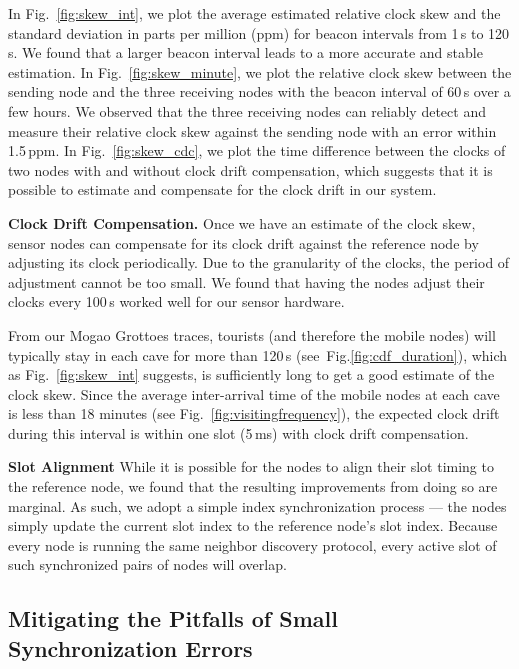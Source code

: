 \documentclass[twoside,twocolumn]{article}
\begin{document}
In Fig.~\ref{fig:skew_int}, we plot the average estimated relative
clock skew and the standard deviation in parts per million (ppm) for
beacon intervals from 1\,s to 120\,s. We found that a larger beacon
interval leads to a more accurate and stable estimation.  In
Fig.~\ref{fig:skew_minute}, we plot the relative clock skew between
the sending node and the three receiving nodes with the beacon
interval of 60\,s over a few hours.  We observed that the three
receiving nodes can reliably detect and measure their relative clock
skew against the sending node with an error within 1.5\,ppm. In
Fig.~\ref{fig:skew_cdc}, we plot the time difference between the
clocks of two nodes with and without clock drift compensation, which
suggests that it is possible to estimate and compensate for the clock
drift in our system.

{\bf Clock Drift Compensation.} Once we have an estimate of the clock
skew, sensor nodes can compensate for its clock drift against the
reference node by adjusting its clock periodically. Due to the
granularity of the clocks, the period of adjustment cannot be too
small. We found that having the nodes adjust their clocks every 100\,s
worked well for our sensor hardware.

From our Mogao Grottoes traces, tourists (and therefore the mobile
nodes) will typically stay in each cave for more than 120\,s
(see~Fig.\ref{fig:cdf_duration}), which as Fig.~\ref{fig:skew_int}
suggests, is sufficiently long to get a good estimate of the clock
skew. Since the average inter-arrival time of the mobile nodes at each
cave is less than 18 minutes (see Fig.~\ref{fig:visitingfrequency}),
the expected clock drift during this interval is within one slot
(5\,ms) with clock drift compensation.

{\bf Slot Alignment} While it is possible for the nodes to align their
slot timing to the reference node, we found that the resulting
improvements from doing so are marginal. As such, we adopt a simple
index synchronization process --- the nodes simply update the current
slot index to the reference node's slot index. Because every node is
running the same neighbor discovery protocol, every active slot of
such synchronized pairs of nodes will overlap.

\subsection{Mitigating the Pitfalls of Small Synchronization Errors}
\label{subsec:pitfall}
\end{document}

